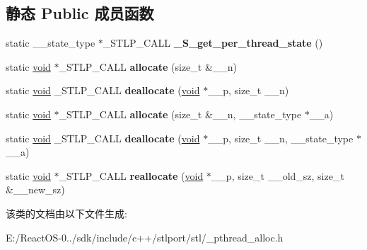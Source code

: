 \subsection*{静态 Public 成员函数}
\begin{DoxyCompactItemize}
\item 
\mbox{\label{class___pthread__alloc_a57b8a2a4bcb9bd15d6ea89069066a9d2}} 
static \+\_\+\+\_\+state\+\_\+type $\ast$\+\_\+\+S\+T\+L\+P\+\_\+\+C\+A\+LL {\bfseries \+\_\+\+S\+\_\+get\+\_\+per\+\_\+thread\+\_\+state} ()
\item 
\mbox{\label{class___pthread__alloc_ad60b879623879ece1375f3c153de378b}} 
static \hyperlink{interfacevoid}{void} $\ast$\+\_\+\+S\+T\+L\+P\+\_\+\+C\+A\+LL {\bfseries allocate} (size\+\_\+t \&\+\_\+\+\_\+n)
\item 
\mbox{\label{class___pthread__alloc_a86ea534e826026ba9710a07bd922f693}} 
static \hyperlink{interfacevoid}{void} \+\_\+\+S\+T\+L\+P\+\_\+\+C\+A\+LL {\bfseries deallocate} (\hyperlink{interfacevoid}{void} $\ast$\+\_\+\+\_\+p, size\+\_\+t \+\_\+\+\_\+n)
\item 
\mbox{\label{class___pthread__alloc_a3753d34cf3e28ff3007b939be658582a}} 
static \hyperlink{interfacevoid}{void} $\ast$\+\_\+\+S\+T\+L\+P\+\_\+\+C\+A\+LL {\bfseries allocate} (size\+\_\+t \&\+\_\+\+\_\+n, \+\_\+\+\_\+state\+\_\+type $\ast$\+\_\+\+\_\+a)
\item 
\mbox{\label{class___pthread__alloc_a895a36b4449181b349f20b37ca2cc0f9}} 
static \hyperlink{interfacevoid}{void} \+\_\+\+S\+T\+L\+P\+\_\+\+C\+A\+LL {\bfseries deallocate} (\hyperlink{interfacevoid}{void} $\ast$\+\_\+\+\_\+p, size\+\_\+t \+\_\+\+\_\+n, \+\_\+\+\_\+state\+\_\+type $\ast$\+\_\+\+\_\+a)
\item 
\mbox{\label{class___pthread__alloc_a5f7a4ac7bb56ce1cd595cc3535050c49}} 
static \hyperlink{interfacevoid}{void} $\ast$\+\_\+\+S\+T\+L\+P\+\_\+\+C\+A\+LL {\bfseries reallocate} (\hyperlink{interfacevoid}{void} $\ast$\+\_\+\+\_\+p, size\+\_\+t \+\_\+\+\_\+old\+\_\+sz, size\+\_\+t \&\+\_\+\+\_\+new\+\_\+sz)
\end{DoxyCompactItemize}


该类的文档由以下文件生成\+:\begin{DoxyCompactItemize}
\item 
E\+:/\+React\+O\+S-\/0../sdk/include/c++/stlport/stl/\+\_\+pthread\+\_\+alloc.\+h\end{DoxyCompactItemize}
